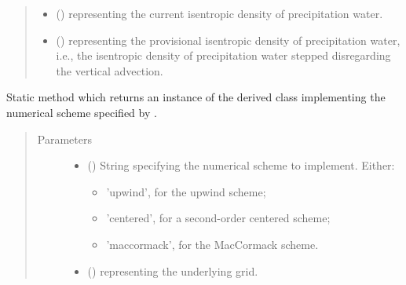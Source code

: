 \documentclass[letterpaper,10pt,english]{sphinxmanual}
\begin{document}
\begin{fulllineitems}
\begin{fulllineitems}
\begin{quote}
\begin{description}
\begin{itemize}
\item {} 
 () \textendash{}  representing the current isentropic density of precipitation water.

\item {} 
 () \textendash{}  representing the provisional isentropic density of precipitation water,
i.e., the isentropic density of precipitation water stepped disregarding the vertical advection.

\end{itemize}

\end{description}\end{quote}

\end{fulllineitems}


\begin{fulllineitems}
\label{\detokenize{api:tasmania.dycore.flux_isentropic.FluxIsentropic.factory}}
Static method which returns an instance of the derived class implementing the numerical scheme
specified by .
\begin{quote}\begin{description}
\item[{Parameters}] \leavevmode\begin{itemize}
\item {} 
 () \textendash{} 
String specifying the numerical scheme to implement. Either:
\begin{itemize}
\item {} 
’upwind’, for the upwind scheme;

\item {} 
’centered’, for a second-order centered scheme;

\item {} 
’maccormack’, for the MacCormack scheme.

\end{itemize}


\item {} 
 () \textendash{} {\hyperref[\detokenize{api:tasmania.grids.grid_xyz.GridXYZ}]{}} representing the underlying grid.


\end{itemize}
\end{description}
\end{quote}
\end{fulllineitems}
\end{fulllineitems}
\end{document}
